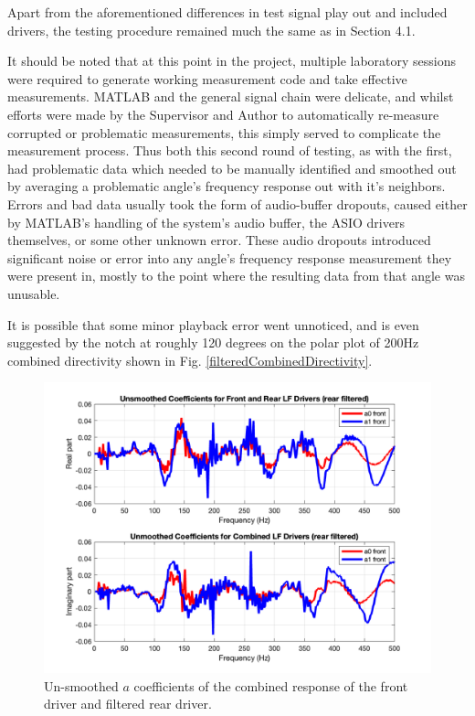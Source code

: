 \documentclass{report}
\begin{document}
            Apart from the aforementioned differences in test signal play out and included drivers, the testing procedure remained much the same as in Section 4.1.

            It should be noted that at this point in the project, multiple laboratory sessions were required to generate working measurement code and take effective measurements. 
            MATLAB and the general signal chain were delicate, and whilst efforts were made by the Supervisor and Author to automatically re-measure corrupted or problematic measurements, this simply served to complicate the measurement process.
            Thus both this second round of testing, as with the first, had problematic data which needed to be manually identified and smoothed out by averaging a problematic angle's frequency response out with it's neighbors.
            Errors and bad data usually took the form of audio-buffer dropouts, caused either by MATLAB's handling of the system's audio buffer, the ASIO drivers themselves, or some other unknown error.
            These audio dropouts introduced significant noise or error into any angle's frequency response measurement they were present in, mostly to the point where the resulting data from that angle was unusable.
            
            It is possible that some minor playback error went unnoticed, and is even suggested by the notch at roughly 120 degrees on the polar plot of 200Hz combined directivity shown in Fig. \ref{filteredCombinedDirectivity}.

            \begin{figure}[H]
                \centering
                \includegraphics[scale = 0.3]{figs/filteredaCoeffNoSmooth.png}
                \caption{Un-smoothed $a$ coefficients of the combined response of the front driver and filtered rear driver.}
                \label{filteredaCoeffNoSmooth}
            \end{figure}
\end{document}
